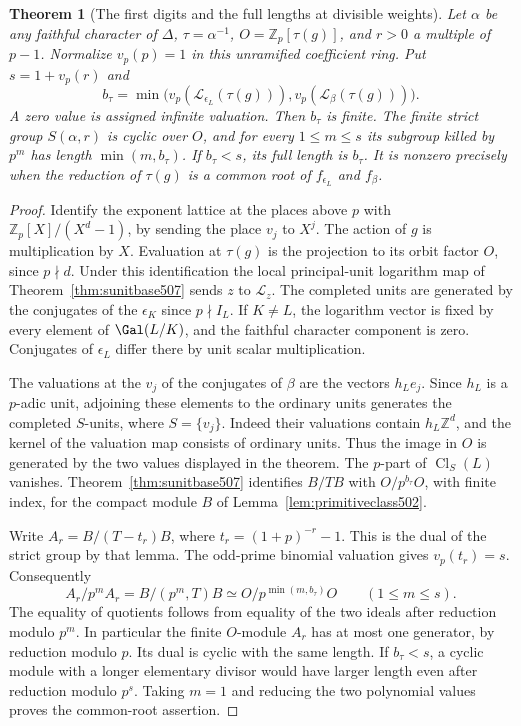 \documentclass[a4paper,11pt]{article}
\newtheorem{theorem}[proposition]{Theorem}
\theoremstyle{definition}
\theoremstyle{remark}
\newcommand{\ZZ}{\mathbb Z}\newcommand{\ord}{\operatorname{ord}}
\numberwithin{equation}{section}
\newcommand{\Cl}{\operatorname{Cl}}
\begin{document}
\begin{theorem}[The first digits and the full lengths at divisible weights]
\leavevmode\label{thm:unitroots523}
Let \(\alpha\) be any faithful character of \(\Delta\),
\(\tau=\alpha^{-1}\), \(O=\ZZ_p[\tau(g)]\), and \(r>0\) a multiple of
\(p-1\). Normalize \(v_p(p)=1\) in this unramified coefficient ring.
Put \(s=1+v_p(r)\) and
\[
 b_\tau=\min\bigl(v_p(\mathcal L_{\epsilon_L}(\tau(g))),
                    v_p(\mathcal L_{\beta}(\tau(g)))\bigr).
\]
A zero value is assigned infinite valuation. Then \(b_\tau\) is finite.
The finite strict group \(S(\alpha,r)\) is cyclic over \(O\), and
for every \(1\le m\le s\) its subgroup killed by \(p^m\) has length
\(\min(m,b_\tau)\). If \(b_\tau<s\), its full length is \(b_\tau\).
It is nonzero precisely when the reduction of \(\tau(g)\) is a
common root of \(f_{\epsilon_L}\) and \(f_\beta\).
\end{theorem}
\begin{proof}
Identify the exponent lattice at the places above \(p\) with
\(\ZZ_p[X]/(X^d-1)\), by sending the place \(v_j\) to \(X^j\).
The action of \(g\) is multiplication by \(X\). Evaluation at
\(\tau(g)\) is the projection to its orbit factor \(O\), since
\(p\nmid d\). Under this identification the local principal-unit
logarithm map of Theorem~\ref{thm:sunitbase507} sends \(z\) to
\(\mathcal L_z\). The completed units are generated by the conjugates
of the \(\epsilon_K\) since \(p\nmid I_L\). If \(K\ne L\), the
logarithm vector is fixed by every element of \(\Gal(L/K)\), and
the faithful character component is zero. Conjugates of
\(\epsilon_L\) differ there by unit scalar multiplication.

The valuations at the \(v_j\) of the conjugates of \(\beta\) are the
vectors \(h_L e_j\). Since \(h_L\) is a \(p\)-adic unit, adjoining
these elements to the ordinary units generates the completed
\(S\)-units, where \(S=\{v_j\}\). Indeed their valuations contain
\(h_L\ZZ^d\), and the kernel of the valuation map consists of
ordinary units. Thus the image in \(O\) is generated by the two
values displayed in the theorem. The \(p\)-part of \(\Cl_S(L)\)
vanishes. Theorem~\ref{thm:sunitbase507} identifies \(B/TB\) with
\(O/p^{b_\tau}O\), with finite index, for the compact module \(B\)
of Lemma~\ref{lem:primitiveclass502}.

Write \(A_r=B/(T-t_r)B\), where \(t_r=(1+p)^{-r}-1\). This is the
dual of the strict group by that lemma. The odd-prime binomial
valuation gives \(v_p(t_r)=s\). Consequently
\[
  A_r/p^m A_r=B/(p^m,T)B\simeq O/p^{\min(m,b_\tau)}O
                      \qquad(1\le m\le s).
\]
The equality of quotients follows from equality of the two ideals
after reduction modulo \(p^m\). In particular the finite \(O\)-module
\(A_r\) has at most one generator, by reduction modulo \(p\). Its
dual is cyclic with the same length. If \(b_\tau<s\), a cyclic
module with a longer elementary divisor would have larger length
even after reduction modulo \(p^s\). Taking \(m=1\) and reducing the
two polynomial values proves the common-root assertion.
\end{proof}
\end{document}
